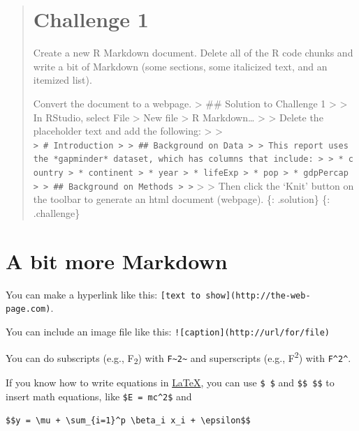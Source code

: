 \documentclass[]{book}
\begin{document}
\begin{quote}
\section{Challenge 1}\label{challenge-1-2}

Create a new R Markdown document. Delete all of the R code chunks and
write a bit of Markdown (some sections, some italicized text, and an
itemized list).

Convert the document to a webpage. \textgreater{} \#\# Solution to
Challenge 1 \textgreater{} \textgreater{} In RStudio, select File
\textgreater{} New file \textgreater{} R Markdown\ldots{} \textgreater{}
\textgreater{} Delete the placeholder text and add the following:
\textgreater{} \textgreater{}
\texttt{\textgreater{}\ \#\ Introduction\ \textgreater{}\ \textgreater{}\ \#\#\ Background\ on\ Data\ \textgreater{}\ \textgreater{}\ This\ report\ uses\ the\ *gapminder*\ dataset,\ which\ has\ columns\ that\ include:\ \textgreater{}\ \textgreater{}\ *\ country\ \textgreater{}\ *\ continent\ \textgreater{}\ *\ year\ \textgreater{}\ *\ lifeExp\ \textgreater{}\ *\ pop\ \textgreater{}\ *\ gdpPercap\ \textgreater{}\ \textgreater{}\ \#\#\ Background\ on\ Methods\ \textgreater{}\ \textgreater{}}
\textgreater{} \textgreater{} Then click the `Knit' button on the
toolbar to generate an html document (webpage). \{: .solution\} \{:
.challenge\}
\end{quote}

\section{A bit more Markdown}\label{a-bit-more-markdown}

You can make a hyperlink like this:
\texttt{{[}text\ to\ show{]}(http://the-web-page.com)}.

You can include an image file like this:
\texttt{!{[}caption{]}(http://url/for/file)}

You can do subscripts (e.g., F\textsubscript{2}) with
\texttt{F\textasciitilde{}2\textasciitilde{}} and superscripts (e.g.,
F\textsuperscript{2}) with \texttt{F\^{}2\^{}}.

If you know how to write equations in
\href{http://www.latex-project.org/}{LaTeX}, you can use \texttt{\$\ \$}
and \texttt{\$\$\ \$\$} to insert math equations, like
\texttt{\$E\ =\ mc\^{}2\$} and

\begin{verbatim}
$$y = \mu + \sum_{i=1}^p \beta_i x_i + \epsilon$$
\end{verbatim}
\end{document}
